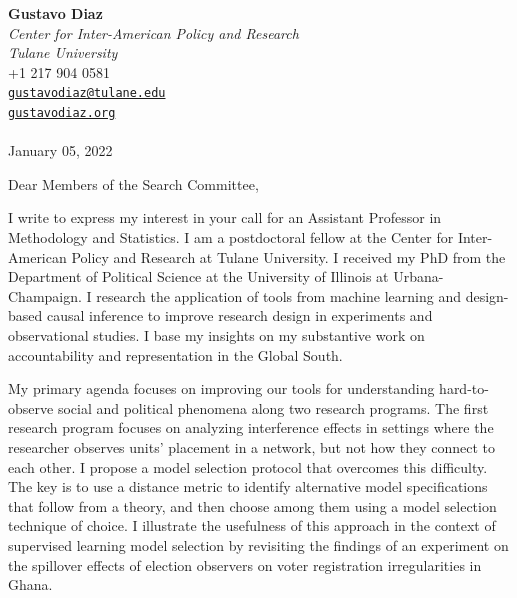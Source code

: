 \documentclass[
  11pt,
]{article}
\author{Gustavo Diaz}
\date{January 05, 2022}
\date{}
\begin{document}
\hfill
\begin{minipage}[t]{1\textwidth}
\raggedleft%
{\bfseries Gustavo Diaz }\\[.35ex]
\emph{\small Center for Inter-American Policy and Research\\
Tulane University} \\[.35ex]
\faPhone \hspace{1 mm} \small{+1 217 904 0581} \\ 
\faEnvelopeO \hspace{1 mm} \small{\tt \href{mailto:gustavodiaz@tulane.edu}{\nolinkurl{gustavodiaz@tulane.edu}}} \\ 
\faGlobe \hspace{1 mm} \small{\href{http://gustavodiaz.org}{\tt gustavodiaz.org}}\\ 
\hspace{1cm} \\
 January 05, 2022 \\ 
\end{minipage}


\vspace*{1em}

Dear Members of the Search Committee,

\vspace*{1em}

 

% 
% 

% 
I write to express my interest in your call for an Assistant Professor
in Methodology and Statistics. I am a postdoctoral fellow at the Center
for Inter-American Policy and Research at Tulane University. I received
my PhD from the Department of Political Science at the University of
Illinois at Urbana-Champaign. I research the application of tools from
machine learning and design-based causal inference to improve research
design in experiments and observational studies. I base my insights on
my substantive work on accountability and representation in the Global
South.

My primary agenda focuses on improving our tools for understanding
hard-to-observe social and political phenomena along two research
programs. The first research program focuses on analyzing interference
effects in settings where the researcher observes units' placement in a
network, but not how they connect to each other. I propose a model
selection protocol that overcomes this difficulty. The key is to use a
distance metric to identify alternative model specifications that follow
from a theory, and then choose among them using a model selection
technique of choice. I illustrate the usefulness of this approach in the
context of supervised learning model selection by revisiting the
findings of an experiment on the spillover effects of election observers
on voter registration irregularities in Ghana.
\end{document}
